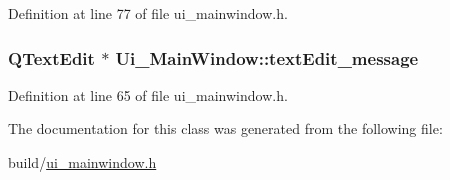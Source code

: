 Definition at line 77 of file ui\+\_\+mainwindow.\+h.

\subsubsection[{\texorpdfstring{text\+Edit\+\_\+message}{textEdit_message}}]{\setlength{\rightskip}{0pt plus 5cm}Q\+Text\+Edit $\ast$ Ui\+\_\+\+Main\+Window\+::text\+Edit\+\_\+message}\hypertarget{class_ui___main_window_ae1dd77d4b2a80359c1f593a940b26418}{}\label{class_ui___main_window_ae1dd77d4b2a80359c1f593a940b26418}


Definition at line 65 of file ui\+\_\+mainwindow.\+h.



The documentation for this class was generated from the following file\+:\begin{DoxyCompactItemize}
\item 
build/\hyperlink{ui__mainwindow_8h}{ui\+\_\+mainwindow.\+h}\end{DoxyCompactItemize}
